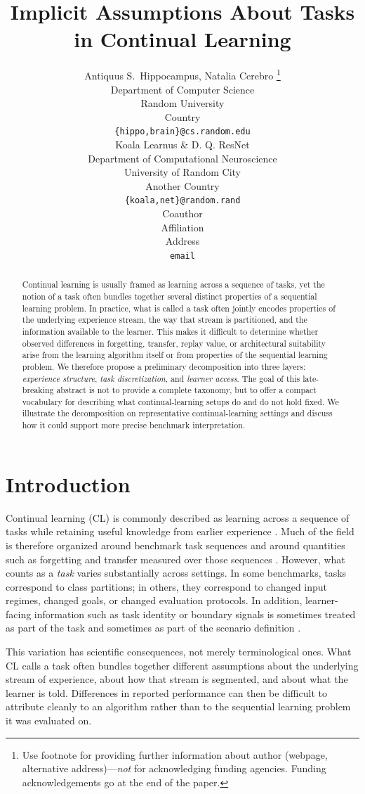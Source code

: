 \documentclass{article} %
\title{Implicit Assumptions About Tasks in Continual Learning}
\author{Antiquus S.~Hippocampus, Natalia Cerebro  \thanks{ Use footnote for providing further information
about author (webpage, alternative address)---\emph{not} for acknowledging
funding agencies.  Funding acknowledgements go at the end of the paper.} \\
Department of Computer Science\\
Random University\\
Country \\
\texttt{\{hippo,brain\}@cs.random.edu} \\
\And %
Koala Learnus \& D. Q. ResNet  \\
Department of Computational Neuroscience \\
University of Random City \\
Another Country \\
\texttt{\{koala,net\}@random.rand} \\
\AND %
Coauthor \\
Affiliation \\
Address \\
\texttt{email}
}
\begin{document}
\maketitle

\begin{abstract}
Continual learning is usually framed as learning across a sequence of tasks, yet the notion of a task often bundles together several distinct properties of a sequential learning problem. In practice, what is called a task often jointly encodes properties of the underlying experience stream, the way that stream is partitioned, and the information available to the learner. This makes it difficult to determine whether observed differences in forgetting, transfer, replay value, or architectural suitability arise from the learning algorithm itself or from properties of the sequential learning problem. We therefore propose a preliminary decomposition into three layers: \emph{experience structure}, \emph{task discretization}, and \emph{learner access}. The goal of this late-breaking abstract is not to provide a complete taxonomy, but to offer a compact vocabulary for describing what continual-learning setups do and do not hold fixed. We illustrate the decomposition on representative continual-learning settings and discuss how it could support more precise benchmark interpretation.
\end{abstract}




\section{Introduction}
Continual learning (CL) is commonly described as learning across a sequence of tasks while retaining useful knowledge from earlier experience \citep{peng2022continual,van2022three,van_de_Ven_2025}. Much of the field is therefore organized around benchmark task sequences and around quantities such as forgetting and transfer measured over those sequences \citep{mendez2022reuse}. However, what counts as a \emph{task} varies substantially across settings. In some benchmarks, tasks correspond to class partitions; in others, they correspond to changed input regimes, changed goals, or changed evaluation protocols. In addition, learner-facing information such as task identity or boundary signals is sometimes treated as part of the task and sometimes as part of the scenario definition \citep{vandeven2019three,van2022three}.

This variation has scientific consequences, not merely terminological ones. What CL calls a task often bundles together different assumptions about the underlying stream of experience, about how that stream is segmented, and about what the learner is told. Differences in reported performance can then be difficult to attribute cleanly to an algorithm rather than to the sequential learning problem it was evaluated on.
\end{document}
